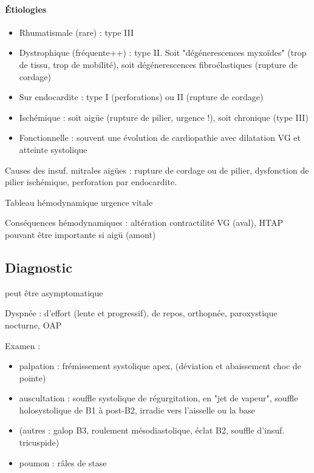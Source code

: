 \paragraph{Étiologies}
\begin{itemize}
  \item Rhumatismale (rare) : type III
  \item Dystrophique (fréquente++) : type II. Soit "dégénerescences myxoïdes"
    (trop de tissu, trop de mobilité), soit dégénerescences fibroélastiques
    (rupture de cordage)
  \item Sur endocardite : type I (perforations) ou II (rupture de cordage)
  \item Ischémique : soit aigüe (rupture de pilier, urgence \skull !), soit
    chronique (type III)
  \item Fonctionnelle : souvent une évolution de cardiopathie avec dilatation VG
    et atteinte systolique
\end{itemize}

Causes des insuf. mitrales aigües : rupture de cordage ou de pilier, dysfonction
de pilier ischémique, perforation par endocardite.

Tableau hémodynamique \thus urgence vitale \danger 

Conséquences hémodynamiques : altération contractilité VG (aval), HTAP pouvant
être importante si aigü (amont)


\subsection{Diagnostic}
\danger{} peut être asymptomatique

Dyspnée : d'effort (lente et progressif), de repos, orthopnée, paroxystique
nocturne, OAP

Examen : 
\begin{itemize}
  \item palpation : frémissement systolique apex, (déviation et abaissement choc
    de pointe)
  \item auscultation : souffle systolique de régurgitation, en "jet de vapeur",
    souffle holosystolique de B1 à post-B2, irradie vers l'aisselle ou la base
  \item (autres : galop B3, roulement mésodiastolique, éclat B2, souffle
    d'insuf. tricuspide)
  \item poumon : râles de stase
\end{itemize}

